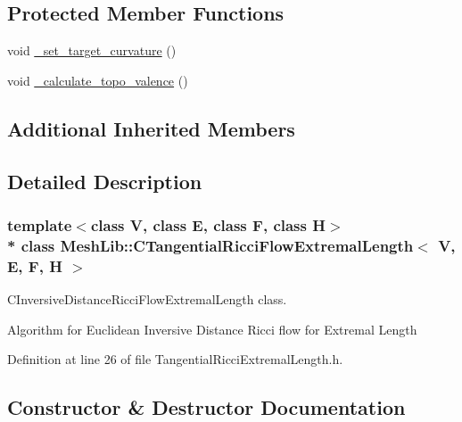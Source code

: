 \subsection*{Protected Member Functions}
\begin{DoxyCompactItemize}
\item 
void \hyperlink{class_mesh_lib_1_1_c_tangential_ricci_flow_extremal_length_a2a1ba73cdc13bd1778ecbf89d632f691}{\+\_\+set\+\_\+target\+\_\+curvature} ()
\item 
void \hyperlink{class_mesh_lib_1_1_c_tangential_ricci_flow_extremal_length_adb8f2cf2ea4253ed325e6f35fddac975}{\+\_\+calculate\+\_\+topo\+\_\+valence} ()
\end{DoxyCompactItemize}
\subsection*{Additional Inherited Members}


\subsection{Detailed Description}
\subsubsection*{template$<$class V, class E, class F, class H$>$\\*
class Mesh\+Lib\+::\+C\+Tangential\+Ricci\+Flow\+Extremal\+Length$<$ V, E, F, H $>$}

C\+Inversive\+Distance\+Ricci\+Flow\+Extremal\+Length class. 

Algorithm for Euclidean Inversive Distance Ricci flow for Extremal Length 

Definition at line 26 of file Tangential\+Ricci\+Extremal\+Length.\+h.



\subsection{Constructor \& Destructor Documentation}
